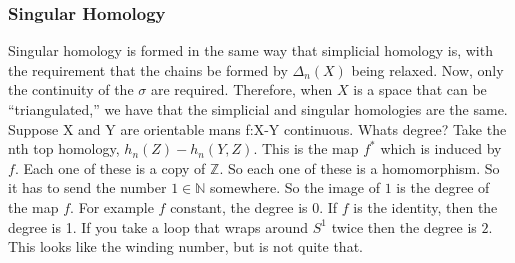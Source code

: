 \documentclass[crop=false,class=article,oneside]{standalone}
\begin{document}
        \subsubsection{Singular Homology}
            Singular homology is formed in the same way that
            simplicial homology is, with the requirement
            that the chains be formed by $\Delta_{n}(X)$ being
            relaxed. Now, only the continuity of the $\sigma$
            are required. Therefore, when $X$ is a space that can
            be ``triangulated,'' we have that the simplicial
            and singular homologies are the same.
            Suppose X and Y are orientable mans f:X-Y continuous. Whats degree?
            Take the nth top homology, $h_n(Z)-h_n(Y,Z)$. This is the map
            $f^*$ which is induced by $f$. Each one of these is a copy of
            $\mathbb{Z}$. So each one of these is a homomorphism. So it has
            to send the number $1\in\mathbb{N}$ somewhere. So the image of
            $1$ is the degree of the map $f$. For example
            $f$ constant, the degree is 0. If $f$ is the identity,
            then the degree is 1. If you take a loop that wraps around
            $S^{1}$ twice then the degree is $2$.
            This looks like the winding number, but is not quite that.
\end{document}
